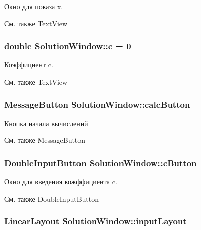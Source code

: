 Окно для показа x. 

\begin{DoxySeeAlso}{См. также}
TextView  
\end{DoxySeeAlso}
\hypertarget{group___u_i_ga30d6d773e312cb1fefce1d66ec691ffa}{
\subsubsection[{c}]{\setlength{\rightskip}{0pt plus 5cm}double {\bf SolutionWindow::c} = 0}}
\label{group___u_i_ga30d6d773e312cb1fefce1d66ec691ffa}


Коэффициент c. 

\begin{DoxySeeAlso}{См. также}
TextView  
\end{DoxySeeAlso}
\hypertarget{group___u_i_ga1022c37f483309ed22237043b5454614}{
\subsubsection[{calcButton}]{\setlength{\rightskip}{0pt plus 5cm}MessageButton {\bf SolutionWindow::calcButton}}}
\label{group___u_i_ga1022c37f483309ed22237043b5454614}


Кнопка начала вычислений 

\begin{DoxySeeAlso}{См. также}
MessageButton  
\end{DoxySeeAlso}
\hypertarget{group___u_i_ga22a74e860b6aa9a54dc402636fdb6b38}{
\subsubsection[{cButton}]{\setlength{\rightskip}{0pt plus 5cm}DoubleInputButton {\bf SolutionWindow::cButton}}}
\label{group___u_i_ga22a74e860b6aa9a54dc402636fdb6b38}


Окно для введения кожффициента c. 

\begin{DoxySeeAlso}{См. также}
DoubleInputButton  
\end{DoxySeeAlso}
\hypertarget{group___u_i_gaf225d99589899b4bef32ce968002032e}{
\subsubsection[{inputLayout}]{\setlength{\rightskip}{0pt plus 5cm}LinearLayout {\bf SolutionWindow::inputLayout}}}
\label{group___u_i_gaf225d99589899b4bef32ce968002032e}


